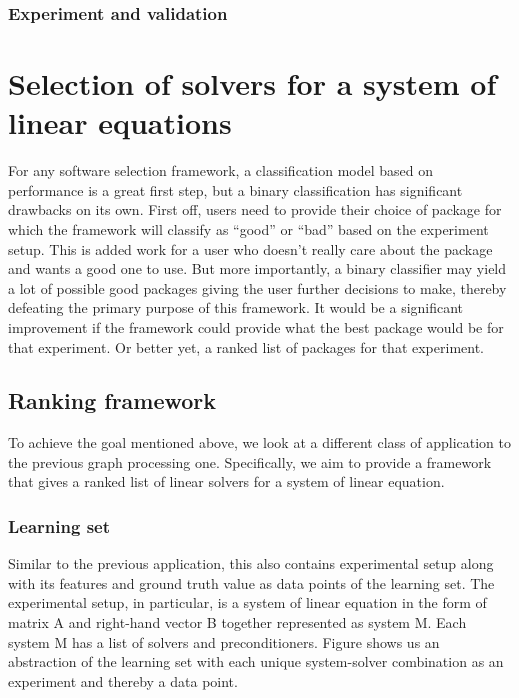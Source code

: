 \subsubsection{Experiment and validation}


\section{Selection of solvers for a system of linear equations}
For any software selection framework, a classification model based on performance is a great first step, but a binary classification has significant drawbacks on its own. First off, users need to provide their choice of package for which the framework will classify as ``good'' or ``bad'' based on the experiment setup. This is added work for a user who doesn't really care about the package and wants a good one to use. But more importantly, a binary classifier may yield a lot of possible good packages giving the user further decisions to make, thereby defeating the primary purpose of this framework. It would be a significant improvement if the framework could provide what the best package would be for that experiment. Or better yet, a ranked list of packages for that experiment.

\subsection{Ranking framework}
To achieve the goal mentioned above, we look at a different class of application to the previous graph processing one. Specifically, we aim to provide a framework that gives a ranked list of linear solvers for a system of linear equation.

\subsubsection{Learning set}
Similar to the previous application, this also contains experimental setup along with its features and ground truth value as data points of the learning set. The experimental setup, in particular, is a system of linear equation in the form of matrix A and right-hand vector B together represented as system M. Each system M has a list of solvers and preconditioners. Figure shows us an abstraction of the learning set with each unique system-solver combination as an experiment and thereby a data point. 

